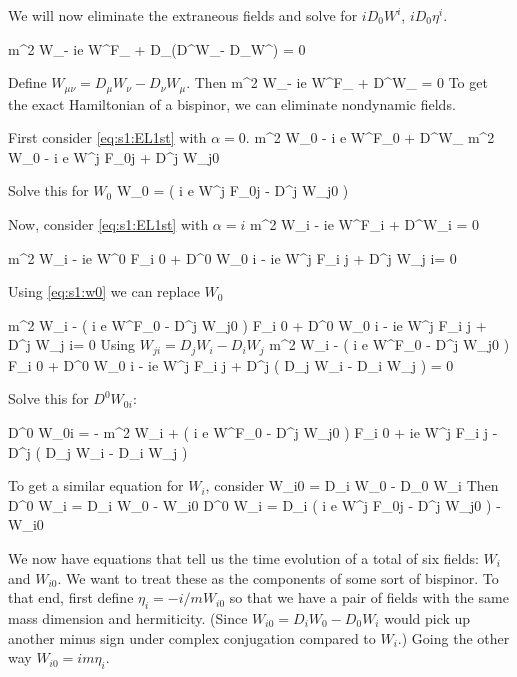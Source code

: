 We will now eliminate the extraneous fields and solve for $iD_0 W^i$, $iD_0 \eta^i$.


\beq 
	m^2 W_\alpha - ie \lambda W^\nu F_{\alpha \nu} + D_\mu (D^\mu W_\alpha - D_\alpha W^\mu) = 0 
\eeq

Define $W_{\mu\nu} = D_\mu W_\nu - D_\nu W_\mu$.  
Then
\beq \label{eq:s1:EL1st}
	m^2 W_\alpha - ie \lambda W^\nu F_{\alpha \nu} + D^\mu W_{\mu \alpha} = 0
\eeq
To get the exact Hamiltonian of a bispinor, we can eliminate nondynamic fields.  

First consider \eqref{eq:s1:EL1st} with $\alpha=0$.
\beq
	m^2 W_0 - i e \lambda W^\nu F_{0\nu} + D^\mu W_{\mu0}
\eeq
\beq
	m^2 W_0 - i e \lambda W^j F_{0j} + D^j W_{j0}
\eeq

Solve this for $W_0$
\beq \label{eq:s1:w0}
	W_0 =  \left( i e \lambda W^j F_{0j} - D^j W_{j0} \right )
\eeq

Now, consider \eqref{eq:s1:EL1st} with $\alpha=i$
\beq
	m^2 W_i - ie \lambda W^\mu F_{i \mu} + D^\mu W_{\mu i} = 0
\eeq

\beq
	m^2 W_i - ie \lambda W^0 F_{i 0} + D^0 W_{0 i} - ie \lambda W^j F_{i j} + D^j W_{j i}= 0
\eeq

Using \eqref{eq:s1:w0} we can replace $W_0$

\beq
	m^2 W_i -  \left( i e \lambda W^\nu F_{0\nu} - D^j W_{j0} \right ) F_{i 0} + D^0 W_{0 i} - ie \lambda W^j F_{i j} + D^j W_{j i}= 0
\eeq
Using $W_{ji} = D_j W_i - D_i W_j$
\beq
	m^2 W_i -  \left( i e \lambda W^\nu F_{0\nu} - D^j W_{j0} \right ) F_{i 0} + D^0 W_{0 i} 
	- ie \lambda W^j F_{i j} + D^j (  D_j W_i - D_i W_j ) = 0
\eeq



Solve this for $D^0 W_{0i}$:

\beq \label{eq:s1:w0i}
	D^0 W_{0i} = - m^2 W_i  +  \left( i e \lambda W^\nu F_{0\nu} - D^j W_{j0} \right ) F_{i 0} 
	+ ie \lambda W^j F_{i j} - D^j (  D_j W_i - D_i W_j )
\eeq


To get a similar equation for $W_i$, consider
\beq
	W_{i0} = D_i W_0 - D_0 W_i
\eeq
Then
\beq
	D^0 W_i = D_i W_0 - W_{i0}
\eeq
\beq \label{eq:s1:wi}
	D^0 W_i = D_i \left( i e \lambda W^j F_{0j} - D^j W_{j0} \right )  - W_{i0}
\eeq

We now have equations that tell us the time evolution of a total of six fields: $W_i$ and $W_{i0}$.  We want to treat these as the components of some sort of bispinor.  To that end, first define $\eta_i = -i/m W_{i0}$ so that we have a pair of fields with the same mass dimension and hermiticity.  (Since $W_{i0} = D_i W_0 - D_0 W_i$ would pick up another minus sign under complex conjugation compared to $W_i$.)  Going the other way $W_{i0} = im \eta_i$.

